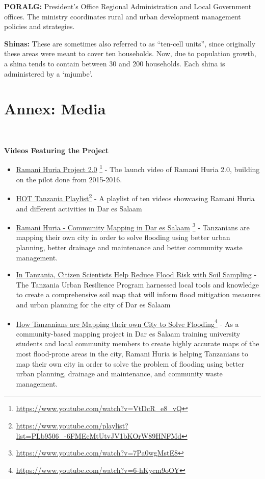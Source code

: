 \documentclass[a4paper,12pt,twoside]{article}
\begin{document}
\textbf{PORALG:} President's Office Regional Administration and Local Government offices. The ministry coordinates rural and urban development management policies and strategies.


\textbf{Shinas:} These are sometimes also referred to as “ten-cell units”, since originally these areas were meant to cover ten households. Now, due to population growth, a shina tends to contain between 30 and 200 households. Each shina is administered by a ‘mjumbe’.

\newpage
\section{Annex: Media}

\

\textbf{Videos Featuring the Project}
	\begin{itemize}
		\item \href{https://www.youtube.com/watch?v=VtDcR_e8_vQ}{Ramani Huria Project 2.0} \footnote{\url{https://www.youtube.com/watch?v=VtDcR_e8_vQ}}
		- The launch video of Ramani Huria 2.0, building on the pilot done from 2015-2016.
		\item \href{https://www.youtube.com/playlist?list=PLb9506_-6FMEcMtUtvJV1bKOrW89HNFMd}{HOT Tanzania Playlist}\footnote{\url{https://www.youtube.com/playlist?list=PLb9506_-6FMEcMtUtvJV1bKOrW89HNFMd}}
		- A playlist of ten videos showcasing Ramani Huria and different activities in Dar es Salaam
		\item \href{https://www.youtube.com/watch?v=7Pa0wgMstE8}{Ramani Huria - Community Mapping in Dar es Salaam} \footnote{\url{https://www.youtube.com/watch?v=7Pa0wgMstE8}} - Tanzanians are mapping their own city in order to solve flooding using better urban planning, better drainage and maintenance and better community waste management.
		\item \href{https://www.worldbank.org/en/news/video/2019/05/15/in-tanzania-citizen-scientists-help-reduce-flood-risk-with-soil-sampling}{In Tanzania, Citizen Scientists Help Reduce Flood Risk with Soil Sampling}
		- The Tanzania Urban Resilience Program harnessed local tools and knowledge to create a comprehensive soil map that will inform flood mitigation measures and urban planning for the city of Dar es Salaam
		\item \href{https://www.youtube.com/watch?v=6-hKycm9oOY}{How Tanzanians are Mapping their own City to Solve Flooding}\footnote{\url{https://www.youtube.com/watch?v=6-hKycm9oOY}}
		- As a community-based mapping project in Dar es Salaam training university students and local community members to create highly accurate maps of the most flood-prone areas in the city, Ramani Huria is helping Tanzanians to map their own city in order to solve the problem of flooding using better urban planning, drainage and maintenance, and community waste management.

\end{itemize}
\end{document}
